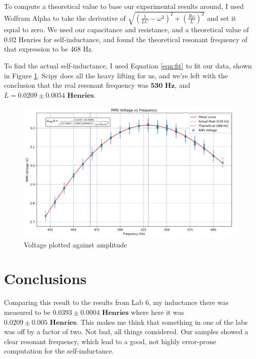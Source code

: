 \documentclass[12pt,letterpaper]{article}
\begin{document}
To compute a theoretical value to base our experimental results around, I used Wolfram Alpha to take the derivative of $\sqrt{\left(\frac{1}{LC}- \omega^2\right)^2+\left(\frac{R\omega}{L}\right)^2}$ and set it equal to zero. We used our capacitance and resistance, and a theoretical value of 0.02 Henries for self-inductance, and found the theoretical resonant frequency of that expression to be 468 Hz.

To find the actual self-inductance, I used Equation \ref{eqn:fit} to fit our data, shown in Figure \ref{fig:fit}. Scipy does all the heavy lifting for us, and we're left with the conclusion that the real resonant frequency was $\mathbf{530}\textbf{ Hz}$, and $L= \mathbf{0.0209 \pm 0.0054} \textbf{ Henries}$.

\begin{figure}[ht]
    \centering
    \includegraphics[width=6.5in]{images/voltage_amplitude_vs_frequency_fitted.png}
    \caption{Voltage plotted against amplitude}
    \label{fig:fit}
\end{figure}


\section{Conclusions}

Comparing this result to the results from Lab 6, my inductance there was measured to be $\mathbf{0.0393 \pm 0.0004}\textbf{ Henries}$ where here it was $\mathbf{0.0209 \pm 0.005} \textbf{ Henries}$. This makes me think that something in one of the labs was off by a factor of two. Not bad, all things considered. Our samples showed a clear resonant frequency, which lead to a good, not highly error-prone computation for the self-inductance.


% 
% 
\end{document}
